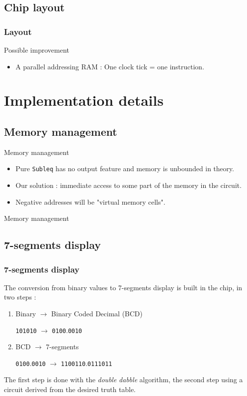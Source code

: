 \documentclass{beamer}
\begin{document}
\subsection{Chip layout}
\begin{frame}
    \frametitle{Layout}
    \centering
    
\end{frame}

\begin{frame}{Possible improvement}
  \begin{itemize}
    \item A parallel addressing RAM : One clock tick = one instruction.
  \end{itemize}
\end{frame}


\section{Implementation details}

\subsection{Memory management}

\begin{frame}{Memory management}
  \begin{itemize}
    \item Pure \texttt{Subleq} has no output feature and memory is
      unbounded in theory.
    \item<2-> Our solution : immediate access to some part of the memory
      in the circuit.
    \item<3-> Negative addresses will be "virtual memory cells".
  \end{itemize}
\end{frame}

\begin{frame}{Memory management}
	\centering
	
\end{frame}

\subsection{7-segments display}

\begin{frame}
  \frametitle{7-segments display}
  The conversion from binary values to 7-segments display is built
  in the chip, in two steps :
  \begin{enumerate}
    \item<2-> Binary $\rightarrow$ Binary Coded Decimal (BCD)

          \texttt{101010} $\rightarrow$ \texttt{0100}.\texttt{0010}
    \item<3-> BCD $\rightarrow$ 7-segments

        \texttt{0100}.\texttt{0010} $\rightarrow$
        \texttt{1100110}.\texttt{0111011}
\end{enumerate}
The first step is done with the \emph{double dabble} algorithm,
the second step using a circuit derived from the desired truth table.

\end{frame}
\end{document}

